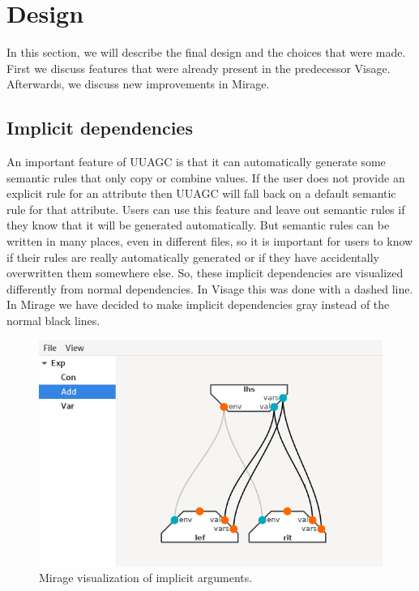 \documentclass[11pt]{article}
\begin{document}
\section{Design}
\label{design}

In this section, we will describe the final design and the choices that were made.
First we discuss features that were already present in the predecessor Visage. Afterwards, we discuss new improvements in Mirage.

\subsection{Implicit dependencies}

An important feature of UUAGC is that it can automatically generate some semantic rules that only copy or combine values. If the user does not provide an explicit rule for an attribute then UUAGC will fall back on a default semantic rule for that attribute. Users can use this feature and leave out semantic rules if they know that it will be generated automatically. But semantic rules can be written in many places, even in different files, so it is important for users to know if their rules are really automatically generated or if they have accidentally overwritten them somewhere else. So, these implicit dependencies are visualized differently from normal dependencies. In Visage this was done with a dashed line. In Mirage we have decided to make implicit dependencies gray instead of the normal black lines.

\begin{figure}[h]
  \centering
  \includegraphics[scale=0.5]{implicit-mirage}
  \caption{Mirage visualization of implicit arguments.}
  \label{implicit-mirage}
\end{figure}
\end{document}
